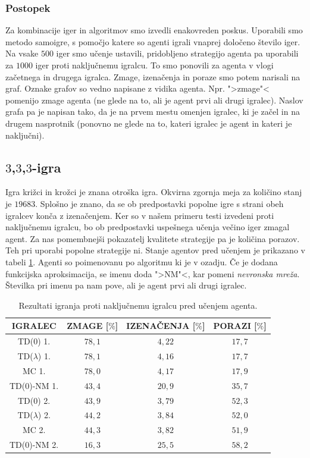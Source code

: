 \documentclass[12pt,a4paper]{amsart}
\theoremstyle{definition} %
\theoremstyle{plain} %
\begin{document}
\subsubsection{Postopek}
Za kombinacije iger in algoritmov smo izvedli enakovreden poskus. Uporabili smo metodo samoigre, 
s pomočjo katere so agenti igrali vnaprej določeno število iger. Na vsake $500$ iger smo učenje 
ustavili, pridobljeno strategijo agenta pa uporabili za $1000$ iger proti naključnemu igralcu. To smo 
ponovili za agenta v vlogi začetnega in drugega igralca. Zmage, izenačenja in poraze smo potem narisali 
na graf. Oznake grafov so vedno napisane z vidika agenta. Npr. ">zmage"< pomenijo zmage agenta (ne glede 
na to, ali je agent prvi ali drugi igralec). Naslov grafa pa je napisan tako, da je na prvem mestu 
omenjen igralec, ki je začel in na drugem nasprotnik (ponovno ne glede na to, kateri igralec je agent 
in kateri je naključni).

\subsection{$3$,$3$,$3$-igra}
Igra križci in krožci je znana otroška igra. Okvirna zgornja meja za količino stanj je $19683$. 
Splošno je znano, da se ob predpostavki popolne igre s strani obeh igralcev konča z izenačenjem. 
Ker so v našem primeru testi izvedeni proti naključnemu igralcu, bo ob predpostavki uspešnega 
učenja večino iger zmagal agent. Za nas pomembnejši pokazatelj kvalitete strategije pa je količina 
porazov. Teh pri uporabi popolne strategije ni. Stanje agentov pred učenjem je prikazano v tabeli 
\ref{tab:1}. Agenti so poimenovanu po algoritmu ki je v ozadju. Če je dodana funkcijska aproksimacija, 
se imenu doda ">NM"<, kar pomeni \textit{nevronska mreža}. Številka pri imenu pa nam pove, ali je 
agent prvi ali drugi igralec.

\begin{center}
    \begin{table}[H]
        \begin{tabular}{| c | c | c | c |}
            \hline
            IGRALEC & ZMAGE [$\%$]& IZENAČENJA [$\%$]& PORAZI [$\%$]\\
            \hline
            TD($0$) 1.&$78,1$&$4,22$&$17,7$\\
            TD($\lambda$) 1.&$78,1$&$4,16$&$17,7$\\
            MC 1.&$78,0$&$4,17$&$17,9$\\
            TD($0$)-NM 1.&$43,4$&$20,9$&$35,7$\\
            \hline
            TD($0$) 2.&$43,9$&$3,79$&$52,3$\\
            TD($\lambda$) 2.&$44,2$&$3,84$&$52,0$\\
            MC 2.&$44,3$&$3,82$&$51,9$\\
            TD($0$)-NM 2.&$16,3$&$25,5$&$58,2$\\
            \hline
    \end{tabular}
    \caption{Rezultati igranja proti naključnemu igralcu pred učenjem agenta.}
    \label{tab:1}
    \end{table}
\end{center}
\end{document}
